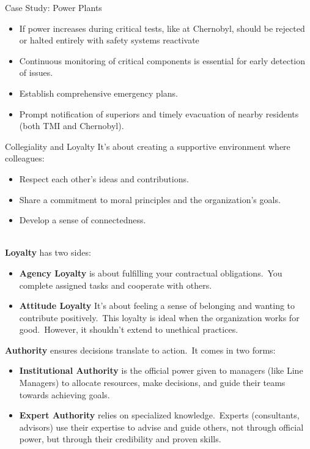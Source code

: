 \documentclass[11pt]{beamer}
\begin{document}
\begin{frame}[t,allowframebreaks]{Case Study: Power Plants}
\begin{itemize}
            \item If power increases during critical tests, like at Chernobyl, should be rejected or halted entirely
            with safety systems reactivate
            \item Continuous monitoring of critical components is essential for early detection of issues.
            \item Establish comprehensive emergency plans.
            \item Prompt notification of superiors and timely evacuation of nearby residents (both TMI and Chernobyl).
        \end{itemize}
    \end{frame}

    \begin{frame}[t,allowframebreaks]{Collegiality and Loyalty}
        It's about creating a supportive environment where colleagues:\\[5pt]
        \begin{itemize}
            \item Respect each other's ideas and contributions.
            \item Share a commitment to moral principles and the organization's goals.
            \item Develop a sense of connectedness.
        \end{itemize}
        \\[10pt]
        \textbf{Loyalty} has two sides:\\[5pt]
        \begin{itemize}
            \item \textbf{Agency Loyalty} is about fulfilling your contractual obligations.\ You complete assigned
            tasks and
            cooperate with others.
            \item \textbf{Attitude Loyalty} It's about feeling a sense of belonging and wanting to contribute
            positively.\ This loyalty is ideal when the organization works for good.\ However, it shouldn't extend to
            unethical practices.
        \end{itemize}

        \framebreak

        \textbf{Authority} ensures decisions translate to action.\ It comes in two forms:\\[5pt]
        \begin{itemize}
            \item \textbf{Institutional Authority} is the official power given to managers (like Line Managers) to
            allocate resources, make decisions, and guide their teams towards achieving goals.
            \item \textbf{Expert Authority} relies on specialized knowledge.\ Experts (consultants, advisors) use
            their expertise to advise and guide others, not through official power, but through their credibility and
            proven skills.
        \end{itemize}
    \end{frame}
\end{document}
